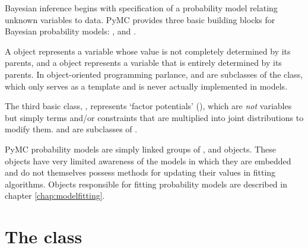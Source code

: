 
Bayesian inference begins with specification of a probability model relating unknown variables to data. PyMC provides three basic building blocks for Bayesian probability models: ,  and . 

A  object represents a variable whose value is not completely determined by its parents, and a  object represents a variable that is entirely determined by its parents. In object-oriented programming parlance,  and  are subclasses of the  class, which only serves as a template and is never actually implemented in models. 

The third basic class, , represents `factor potentials' (\cite{dawidmarkov,Jordan:2004p5439}), which are \emph{not} variables but simply terms and/or constraints that are multiplied into joint distributions to modify them.  and  are subclasses of .



\medskip
PyMC probability models are simply linked groups of ,  and  objects. These objects have very limited awareness of the models in which they are embedded and do not themselves possess methods for updating their values in fitting algorithms. Objects responsible for fitting probability models are described in chapter \ref{chap:modelfitting}.
 

\hypertarget{stochastic}{}
\section*{The  class} \label{stochastic}

